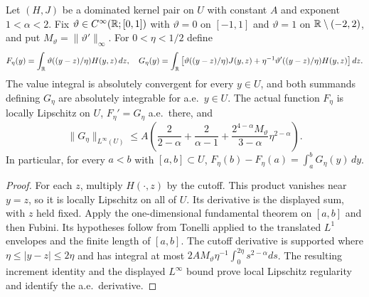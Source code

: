 \begin{lemma}
  \label{lem:c10_cutoff_weak_derivative}
  Let $(H,J)$ be a dominated kernel pair on $U$ with constant $A$ and exponent $1<\alpha<2$.
  Fix $\vartheta\in C^\infty(\mathbb{R};[0,1])$ with $\vartheta=0$ on $[-1,1]$ and
  $\vartheta=1$ on $\mathbb{R}\setminus(-2,2)$, and put $M_\vartheta=\|\vartheta'\|_\infty$.
  For $0<\eta<1/2$ define
  \[
    F_\eta(y)=\int_{\mathbb{R}}\vartheta((y-z)/\eta)H(y,z)\,dz,
    \quad
    G_\eta(y)=\int_{\mathbb{R}}\left[\vartheta((y-z)/\eta)J(y,z)
           +\eta^{-1}\vartheta'((y-z)/\eta)H(y,z)\right]dz.
  \]
  The value integral is absolutely convergent for every $y\in U$, and both summands defining
  $G_\eta$ are absolutely integrable for a.e.\ $y\in U$. The actual function $F_\eta$ is locally
  Lipschitz on $U$, $F_\eta'=G_\eta$ a.e.\ there, and
  \[
    \|G_\eta\|_{L^\infty(U)}\le A\left(\frac2{2-\alpha}+\frac2{\alpha-1}
           +\frac{2^{4-\alpha}M_\vartheta}{3-\alpha}\eta^{2-\alpha}\right).
  \]
  In particular, for every $a<b$ with $[a,b]\subset U$,
  $F_\eta(b)-F_\eta(a)=\int_a^bG_\eta(y)\,dy$.
\end{lemma}
\begin{proof}
  For each $z$, multiply $H(\cdot,z)$ by the cutoff. This product vanishes near $y=z$, so it is
  locally Lipschitz on all of $U$. Its derivative is the displayed sum, with $z$ held fixed.
  Apply the one-dimensional fundamental theorem on $[a,b]$ and then Fubini. Its hypotheses follow
  from Tonelli applied to the translated $L^1$ envelopes and the finite length of $[a,b]$.
  The cutoff derivative is supported where $\eta\le|y-z|\le2\eta$ and has integral at most
  $2AM_\vartheta\eta^{-1}\int_0^{2\eta}s^{2-\alpha}ds$.
  The resulting increment identity and the displayed $L^\infty$ bound prove local Lipschitz
  regularity and identify the a.e.\ derivative.
\end{proof}

